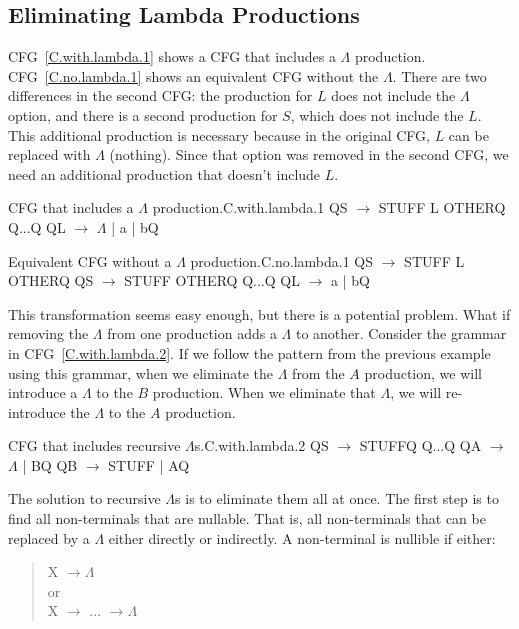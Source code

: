\documentclass[letterpaper,12pt,openany,reqno]{book}%
\newcommand{\cfgprod}[2] {{\ttfamily #1} $\rightarrow$ {\ttfamily #2}}
\begin{document}
\subsection {Eliminating Lambda Productions}
CFG~\ref{C.with.lambda.1} shows a CFG that includes a $\Lambda$ production. CFG~\ref{C.no.lambda.1} shows an equivalent CFG without the $\Lambda$. There are two differences in the second CFG: the production for $L$ does not include the $\Lambda$ option, and there is a second production for $S$, which does not include the $L$. This additional production is necessary because in the original CFG, $L$ can be replaced with $\Lambda$ (nothing). Since that option was removed in the second CFG, we need an additional production that doesn't include $L$.
\begin{cfg}{CFG that includes a $\Lambda$ production.}{C.with.lambda.1}
Q\cfgprod{S}{STUFF L OTHER}Q
Q...Q
Q\cfgprod{L}{$\Lambda$ | a | b}Q
\end{cfg}
\begin{cfg}{Equivalent CFG without a $\Lambda$ production.}{C.no.lambda.1}
Q\cfgprod{S}{STUFF L OTHER}Q
Q\cfgprod{S}{STUFF OTHER}Q
Q...Q
Q\cfgprod{L}{a | b}Q
\end{cfg}

This transformation seems easy enough, but there is a potential problem. What if removing the $\Lambda$ from one production adds a $\Lambda$ to another. Consider the grammar in CFG~\ref{C.with.lambda.2}. If we follow the pattern from the previous example using this grammar, when we eliminate the $\Lambda$ from the $A$ production, we will introduce a $\Lambda$ to the $B$ production. When we eliminate that $\Lambda$, we will re-introduce the $\Lambda$ to the $A$ production.
\begin{cfg}{CFG that includes recursive $\Lambda$s.}{C.with.lambda.2}
Q\cfgprod{S}{STUFF}Q
Q...Q
Q\cfgprod{A}{$\Lambda$ | B}Q
Q\cfgprod{B}{STUFF | A}Q
\end{cfg}

The solution to recursive $\Lambda$s is to eliminate them all at once. The first step is to find all non-terminals that are nullable. That is, all non-terminals that can be replaced by a $\Lambda$ either directly or indirectly. A non-terminal is nullible if either:
\begin{quote}
{\ttfamily X} $\rightarrow \Lambda$\\
or\\
{\ttfamily X} $\rightarrow$ ... $\rightarrow \Lambda$\\
\end{quote}
\end{document}
